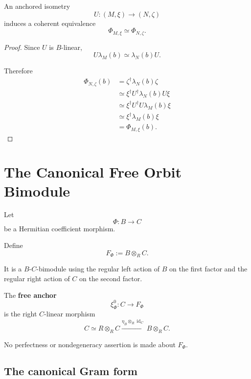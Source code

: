 \begin{proposition}
\label{prop:higher-anchored-isometries-preserve-coefficients}
An anchored isometry
\[
  U:(M,\xi)\to(N,\zeta)
\]
induces a coherent equivalence
\[
  \Phi_{M,\xi}
  \simeq
  \Phi_{N,\zeta}.
\]
\end{proposition}

\begin{proof}
Since \(U\) is \(B\)-linear,
\[
  U\lambda_M(b)
  \simeq
  \lambda_N(b)U.
\]

Therefore
\[
\begin{aligned}
  \Phi_{N,\zeta}(b)
  &=
  \zeta^\dagger\lambda_N(b)\zeta
  \\
  &\simeq
  \xi^\dagger
  U^\dagger
  \lambda_N(b)
  U
  \xi
  \\
  &\simeq
  \xi^\dagger
  U^\dagger U
  \lambda_M(b)
  \xi
  \\
  &\simeq
  \xi^\dagger\lambda_M(b)\xi
  \\
  &=
  \Phi_{M,\xi}(b).
\end{aligned}
\]
\end{proof}

\section{The Canonical Free Orbit Bimodule}
\label{sec:higher-free-orbit-bimodule}

Let
\[
  \Phi:B\to C
\]
be a Hermitian coefficient morphism.

\begin{definition}
\label{def:higher-free-orbit-bimodule}
Define
\[
  F_\Phi
  :=
  B\otimes_RC.
\]

It is a \(B\)-\(C\)-bimodule using the regular left action of \(B\) on the
first factor and the regular right action of \(C\) on the second factor.

The \textbf{free anchor}
\[
  \xi_\Phi^0:C\to F_\Phi
\]
is the right \(C\)-linear morphism
\[
  C
  \simeq
  R\otimes_RC
  \xrightarrow{\eta_B\otimes_R\operatorname{id}_C}
  B\otimes_RC.
\]
\end{definition}

No perfectness or nondegeneracy assertion is made about \(F_\Phi\).

\subsection{The canonical Gram form}

